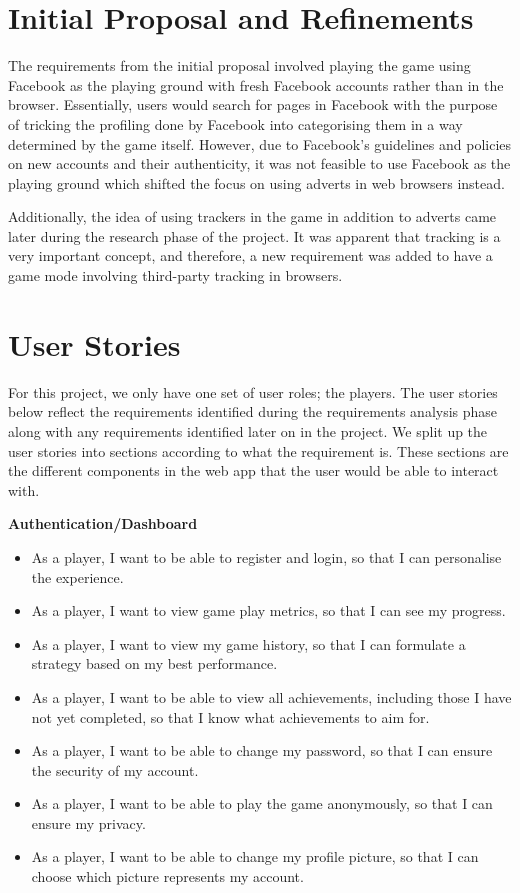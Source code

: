 \documentclass{l4proj}
\begin{document}
\section{Initial Proposal and Refinements}
The requirements from the initial proposal involved playing the game using Facebook as the playing ground with fresh Facebook accounts rather than in the browser. Essentially, users would search for pages in Facebook with the purpose of tricking the profiling done by Facebook into categorising them in a way determined by the game itself. However, due to Facebook's guidelines and policies on new accounts and their authenticity, it was not feasible to use Facebook as the playing ground which shifted the focus on using adverts in web browsers instead.

Additionally, the idea of using trackers in the game in addition to adverts came later during the research phase of the project. It was apparent that tracking is a very important concept, and therefore, a new requirement was added to have a game mode involving third-party tracking in browsers.

\section{User Stories}
For this project, we only have one set of user roles; the players. The user stories below reflect the requirements identified during the requirements analysis phase along with any requirements identified later on in the project. We split up the user stories into sections according to what the requirement is. These sections are the different components in the web app that the user would be able to interact with.

\textbf{Authentication/Dashboard}
\begin{itemize}
    \item As a player, I want to be able to register and login, so that I can personalise the experience.
    \item As a player, I want to view game play metrics, so that I can see my progress.
    \item As a player, I want to view my game history, so that I can formulate a strategy based on my best performance.
    \item As a player, I want to be able to view all achievements, including those I have not yet completed, so that I know what achievements to aim for.
    \item As a player, I want to be able to change my password, so that I can ensure the security of my account.
    \item As a player, I want to be able to play the game anonymously, so that I can ensure my privacy.
    \item As a player, I want to be able to change my profile picture, so that I can choose which picture represents my account.
\end{itemize}
\end{document}

